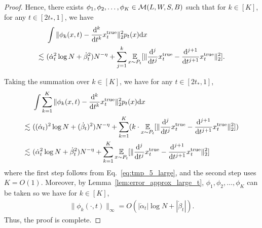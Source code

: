 \begin{proof}
     Hence, there exists $\phi_1, \phi_2, \ldots, \phi_K \in {\cal M}(L,W,S,B)$ such that for $k \in [K]$, for any $t \in [2t_*, 1]$, we have
    \begin{align}
    &~ \int \|\phi_k(x, t) - \frac{\mathrm{d}^k}{\mathrm{d} t^k}{x}_t^\mathrm{true}\|^2_2 p_t(x) \mathrm{d} x \notag \\
    \lesssim &~ 
    (\dot{\alpha}_t^{2} \log N  +   \dot{\beta}_t^{2} ) N^{-\eta} +
    \sum_{j=1}^{k}\operatorname*{{\mathbb{E}}}_{x \sim P_t}[\|\frac{\mathrm{d}^{j}}{\mathrm{d} t^{j}}x_t^\mathrm{true} - \frac{\mathrm{d}^{j+1}}{\mathrm{d} t^{j+1}}x_t^\mathrm{true}\|_2^2]. \label{eq:tmp_5_large}
    \end{align}

    Taking the summation over $k \in [K]$, we have for any $t \in [2 t_*, 1]$,
    \begin{align*}
        &~ \int \sum_{k=1}^K \|\phi_k(x, t) - \frac{\mathrm{d}^k}{\mathrm{d} t^k}{x}_t^\mathrm{true}\|^2_2 p_t(x) \mathrm{d} x \notag \\
    \lesssim &~ 
    ((\dot{\alpha}_t )^{2} \log N  +   (\dot{\beta}_t )^{2} ) N^{-\eta} +
    \sum_{k=1}^{K} (k \cdot \operatorname*{{\mathbb{E}}}_{x \sim P_t}[\|\frac{\mathrm{d}^{j}}{\mathrm{d} t^{j}}x_t^\mathrm{true} - \frac{\mathrm{d}^{j+1}}{\mathrm{d} t^{j+1}}x_t^\mathrm{true}\|_2^2]) \\
    \lesssim &~ (\dot{\alpha}_t^{2} \log N  +   \dot{\beta}_t^{2} ) N^{-\eta} +
    \sum_{k=1}^{K} \operatorname*{{\mathbb{E}}}_{x \sim P_t}[\|\frac{\mathrm{d}^{j}}{\mathrm{d} t^{j}}x_t^\mathrm{true} - \frac{\mathrm{d}^{j+1}}{\mathrm{d} t^{j+1}}x_t^\mathrm{true}\|_2^2]
    \end{align*}
    where the first step follows from Eq.~\eqref{eq:tmp_5_large}, and the second step uses $K=O(1)$.
   Moreover, by Lemma~\ref{lem:error_approx_large_t}, $\phi_1, \phi_2, \ldots, \phi_K$ can be taken so we have for $k \in [K]$,
    \begin{align*}
         \|\phi_k(\cdot,t) \|_\infty = O(  |\dot{\alpha}_t | \log N +  |\dot{\beta}_t |).
    \end{align*}
    Thus, the proof is complete.
\end{proof}